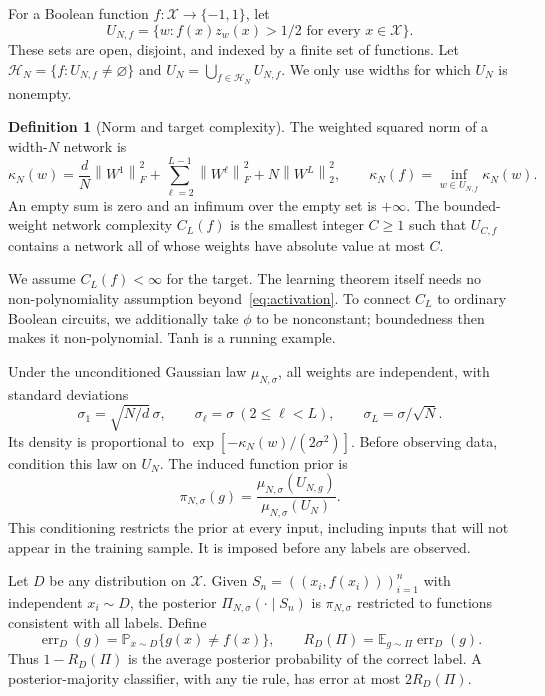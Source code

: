\documentclass[11pt]{article}
\theoremstyle{definition}
\newtheorem{definition}[theorem]{Definition}
\newcommand{\E}{\mathbb E}
\newcommand{\PP}{\mathbb P}
\newcommand{\cH}{\mathcal H}
\newcommand{\cX}{\mathcal X}
\newcommand{\norm}[1]{\left\lVert#1\right\rVert}
\DeclareMathOperator{\err}{err}
\begin{document}
For a Boolean function $f:\cX\to\{-1,1\}$, let
\[
 U_{N,f}=\{w:f(x)z_w(x)>1/2\text{ for every }x\in\cX\}.
\]
These sets are open, disjoint, and indexed by a finite set of functions. Let $\cH_N=\{f:U_{N,f}\ne\varnothing\}$ and $U_N=\bigcup_{f\in\cH_N}U_{N,f}$. We only use widths for which $U_N$ is nonempty.

\begin{definition}[Norm and target complexity]
The weighted squared norm of a width-$N$ network is
\begin{equation}\label{eq:norm}
 \kappa_N(w)=\frac dN\norm{W^1}_F^2+
 \sum_{\ell=2}^{L-1}\norm{W^\ell}_F^2+N\norm{W^L}_2^2,
 \qquad
 \kappa_N(f)=\inf_{w\in U_{N,f}}\kappa_N(w).
\end{equation}
An empty sum is zero and an infimum over the empty set is $+\infty$. The bounded-weight network complexity $C_L(f)$ is the smallest integer $C\geq1$ such that $U_{C,f}$ contains a network all of whose weights have absolute value at most $C$.
\end{definition}

We assume $C_L(f)<\infty$ for the target. The learning theorem itself needs no non-polynomiality assumption beyond~\eqref{eq:activation}. To connect $C_L$ to ordinary Boolean circuits, we additionally take $\phi$ to be nonconstant; boundedness then makes it non-polynomial. Tanh is a running example.

Under the unconditioned Gaussian law $\mu_{N,\sigma}$, all weights are independent, with standard deviations
\begin{equation}\label{eq:prior}
 \sigma_1=\sqrt{N/d}\,\sigma,\qquad
 \sigma_\ell=\sigma\ (2\leq\ell<L),\qquad
 \sigma_L=\sigma/\sqrt N.
\end{equation}
Its density is proportional to $\exp[-\kappa_N(w)/(2\sigma^2)]$. Before observing data, condition this law on $U_N$. The induced function prior is
\[
 \pi_{N,\sigma}(g)=\frac{\mu_{N,\sigma}(U_{N,g})}{\mu_{N,\sigma}(U_N)}.
\]
This conditioning restricts the prior at every input, including inputs that will not appear in the training sample. It is imposed before any labels are observed.

Let $D$ be any distribution on $\cX$. Given $S_n=((x_i,f(x_i)))_{i=1}^n$ with independent $x_i\sim D$, the posterior $\Pi_{N,\sigma}(\cdot\mid S_n)$ is $\pi_{N,\sigma}$ restricted to functions consistent with all labels. Define
\[
 \err_D(g)=\PP_{x\sim D}\{g(x)\ne f(x)\},\qquad
 R_D(\Pi)=\E_{g\sim\Pi}\err_D(g).
\]
Thus $1-R_D(\Pi)$ is the average posterior probability of the correct label. A posterior-majority classifier, with any tie rule, has error at most $2R_D(\Pi)$.
\end{document}

